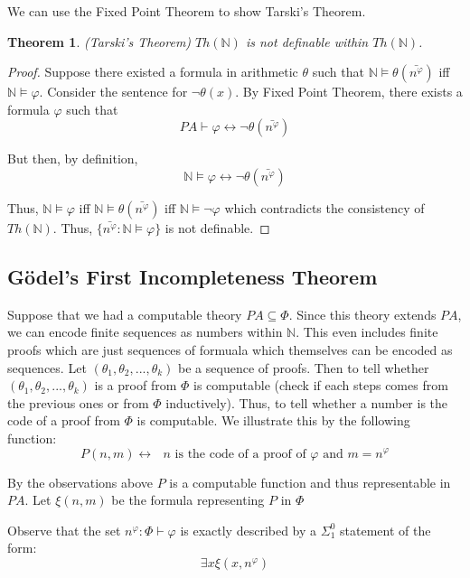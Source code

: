 \documentclass[a4paper,10pt]{article}
\newtheorem{theorem}{Theorem}[section]
\let\phi\varphi
\newcommand*\NN{\mathbb{N}}
\newcommand*\n{\newline\par}
\newcommand*\phibar{\bar{n^{\phi}}}
\newcommand*\prf{\vdash}
\newcommand*\mo{\vDash}
\newcommand*\biject{\leftrightarrow}
\begin{document}
  We can use the Fixed Point Theorem to show Tarski's Theorem.
  
  \begin{theorem}
   (Tarski's Theorem) $Th(\NN)$ is not definable within $Th(\NN)$.
  \end{theorem}
  
  \begin{proof}
   Suppose there existed a formula in arithmetic $\theta$ such that $\NN \mo \theta(\phibar)$ iff $\NN \mo \phi$. Consider the sentence for $\neg\theta(x)$. By Fixed Point Theorem, there exists a formula $\phi$ such that
   \begin{equation*}
    PA \prf \phi \biject \neg\theta(\phibar) 
   \end{equation*}

   But then, by definition,
   \begin{equation*}
    \NN \mo \phi \biject \neg\theta(\phibar) 
   \end{equation*}
    
   Thus, $\NN \mo \phi$ iff $\NN \mo \theta(\phibar)$ iff $\NN \mo \neg\phi$ which contradicts the consistency of $Th(\NN)$. Thus, $\{\phibar : \NN \mo \phi\}$ is not definable.
  \end{proof}

  \newpage
  \subsection{G\"{o}del's First Incompleteness Theorem}

  Suppose that we had a computable theory $PA \subseteq \Phi$. Since this theory extends $PA$, we can encode finite sequences as numbers within $\NN$. This even includes finite proofs which are just
  sequences of formuala which themselves can be encoded as sequences. Let $(\theta_1,\theta_2, ... , \theta_k)$ be a sequence of proofs. Then to tell whether $(\theta_1,\theta_2, ... , \theta_k)$  is a proof from $\Phi$ is computable (check if each steps comes from the previous ones or from $\Phi$ inductively). Thus, to tell whether a number is the code of a proof from $\Phi$ is computable.
  We illustrate this by the following function:
  \begin{equation*}
   P(n,m) \biject \text{ $n$ is the code of a proof of $\phi$ and $m = n^{\phi}$}
  \end{equation*}

  By the observations above $P$ is a computable function and thus representable in $PA$. Let $\xi(n,m)$ be the formula representing $P$ in $\Phi$\n
  Observe that the set $n^{\phi} : \Phi \prf \phi$ is exactly described by a $\Sigma^0_1$ statement of the form: 
  \begin{equation*}
   \exists x \xi(x,n^{\phi})
  \end{equation*}
 
\end{document}
